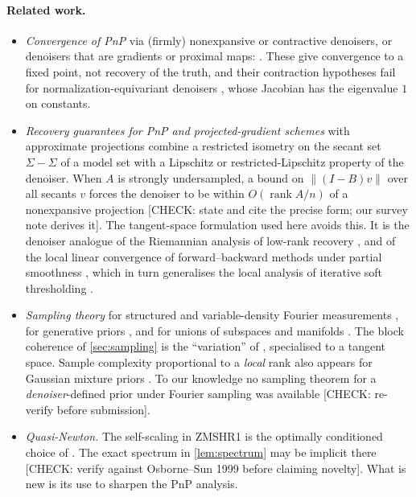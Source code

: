 \documentclass[11pt]{article}
\theoremstyle{definition}
\theoremstyle{remark}
\newcommand{\norm}[1]{\lVert #1\rVert}
\newcommand{\chk}[1]{\textcolor{red!70!black}{[CHECK: #1]}}
\begin{document}
\paragraph{Related work.}
\begin{itemize}
\item \emph{Convergence of PnP} via (firmly) nonexpansive or contractive denoisers, or denoisers that are
  gradients or proximal maps: \cite{ryu2019,chan2017,pesquet2021,hurault2022gs,gilton2021}. These give convergence
  to a fixed point, not recovery of the truth, and their contraction hypotheses fail for normalization-equivariant
  denoisers \cite{herbreteau2023}, whose Jacobian has the eigenvalue $1$ on constants.
\item \emph{Recovery guarantees for PnP and projected-gradient schemes} with approximate projections
  \cite{liu2021pnprec,traonmilin2024,joundi2025,leong2025,wolf2026} combine a restricted isometry on the secant set
  $\Sigma-\Sigma$ of a model set with a Lipschitz or restricted-Lipschitz property of the denoiser. When $A$ is
  strongly undersampled, a bound on $\norm{(I-B)v}$ over all secants $v$ forces the denoiser to be within
  $O(\operatorname{rank}A/n)$ of a nonexpansive projection \chk{state and cite the precise form; our survey note
  derives it}. The tangent-space formulation used here avoids this. It is the denoiser analogue of the
  Riemannian analysis of low-rank recovery \cite{wei2016riemannian}, and of the local linear convergence of
  forward--backward methods under partial smoothness \cite{liang2017fb}, which in turn generalises the local
  analysis of iterative soft thresholding \cite{bredies2008,hale2008}.
\item \emph{Sampling theory} for structured and variable-density Fourier measurements
  \cite{krahmer2014,adcock2017breaking}, for generative priors \cite{bora2017,berk2022coherence,adcock2024unified},
  and for unions of subspaces and manifolds \cite{blumensath2009,baraniuk2009manifolds,eftekhari2015}. The block
  coherence of \cref{sec:sampling} is the ``variation'' of \cite{adcock2024unified}, specialised to a
  tangent space. Sample complexity proportional to a \emph{local} rank also appears for Gaussian mixture priors
  \cite{renna2014gmm}. To our knowledge no sampling theorem for a \emph{denoiser}-defined prior under Fourier
  sampling was available \chk{re-verify before submission}.
\item \emph{Quasi-Newton.} The self-scaling in ZMSHR1 is the optimally conditioned choice of
  \cite{osborne1999,davidon1975}. The exact spectrum in \cref{lem:spectrum} may be implicit there
  \chk{verify against Osborne--Sun 1999 before claiming novelty}. What is new is its use to sharpen the PnP
  analysis.
\end{itemize}
\end{document}

